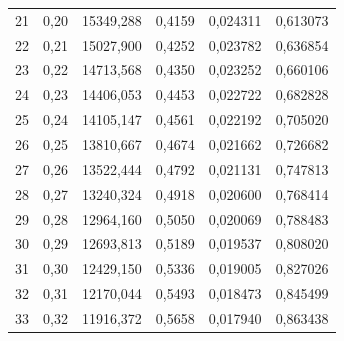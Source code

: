 \begin{exemple}
\begin{center}
\begin{tabular}{S[table-format=2.0]S[table-format=1.2]
				S[table-format=5.3]S[table-format=1.4]
				S[table-format=1.6]S[table-format=1.6]}
			21  &  0,20  &  15349,288  &  0,4159  &  0,024311  &  0,613073 \\
			22  &  0,21  &  15027,900  &  0,4252  &  0,023782  &  0,636854 \\
			23  &  0,22  &  14713,568  &  0,4350  &  0,023252  &  0,660106 \\
			24  &  0,23  &  14406,053  &  0,4453  &  0,022722  &  0,682828 \\
			25  &  0,24  &  14105,147  &  0,4561  &  0,022192  &  0,705020 \\
			26  &  0,25  &  13810,667  &  0,4674  &  0,021662  &  0,726682 \\
			27  &  0,26  &  13522,444  &  0,4792  &  0,021131  &  0,747813 \\
			28  &  0,27  &  13240,324  &  0,4918  &  0,020600  &  0,768414 \\
			29  &  0,28  &  12964,160  &  0,5050  &  0,020069  &  0,788483 \\
			30  &  0,29  &  12693,813  &  0,5189  &  0,019537  &  0,808020 \\
			31  &  0,30  &  12429,150  &  0,5336  &  0,019005  &  0,827026 \\
			32  &  0,31  &  12170,044  &  0,5493  &  0,018473  &  0,845499 \\
			33  &  0,32  &  11916,372  &  0,5658  &  0,017940  &  0,863438 \\
			\midrule
		\end{tabular}
	\end{center}
	

\end{exemple}
